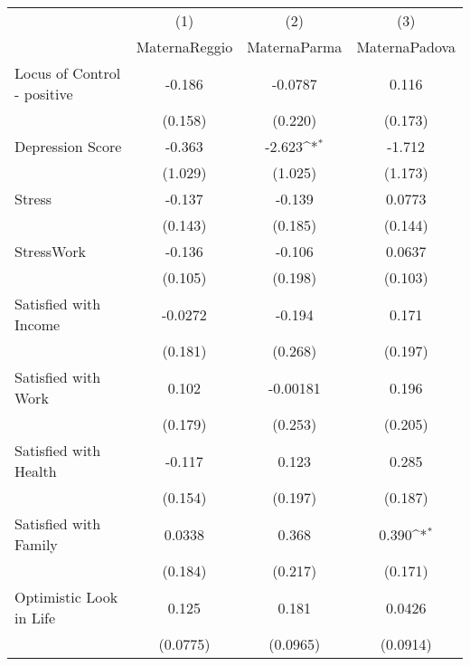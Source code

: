 {
\def\sym#1{\ifmmode^{#1}\else\(^{#1}\)\fi}
\begin{tabular}{l*{3}{c}}
\hline\hline
            &\multicolumn{1}{c}{(1)}&\multicolumn{1}{c}{(2)}&\multicolumn{1}{c}{(3)}\\
            &\multicolumn{1}{c}{MaternaReggio}&\multicolumn{1}{c}{MaternaParma}&\multicolumn{1}{c}{MaternaPadova}\\
\hline
Locus of Control - positive&      -0.186         &     -0.0787         &       0.116         \\
            &     (0.158)         &     (0.220)         &     (0.173)         \\
[1em]
Depression Score&      -0.363         &      -2.623\sym{*}  &      -1.712         \\
            &     (1.029)         &     (1.025)         &     (1.173)         \\
[1em]
Stress      &      -0.137         &      -0.139         &      0.0773         \\
            &     (0.143)         &     (0.185)         &     (0.144)         \\
[1em]
StressWork  &      -0.136         &      -0.106         &      0.0637         \\
            &     (0.105)         &     (0.198)         &     (0.103)         \\
[1em]
Satisfied with Income&     -0.0272         &      -0.194         &       0.171         \\
            &     (0.181)         &     (0.268)         &     (0.197)         \\
[1em]
Satisfied with Work&       0.102         &    -0.00181         &       0.196         \\
            &     (0.179)         &     (0.253)         &     (0.205)         \\
[1em]
Satisfied with Health&      -0.117         &       0.123         &       0.285         \\
            &     (0.154)         &     (0.197)         &     (0.187)         \\
[1em]
Satisfied with Family&      0.0338         &       0.368         &       0.390\sym{*}  \\
            &     (0.184)         &     (0.217)         &     (0.171)         \\
[1em]
Optimistic Look in Life&       0.125         &       0.181         &      0.0426         \\
            &    (0.0775)         &    (0.0965)         &    (0.0914)         \\

\end{tabular}}
